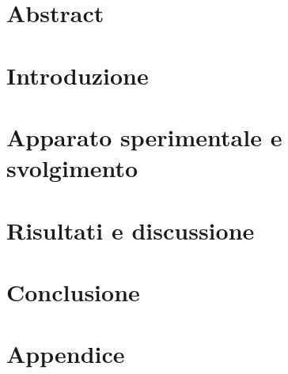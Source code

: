 \documentclass[12pt]{article}
\begin{document}


\section*{Abstract}


\section{Introduzione}


\section{Apparato sperimentale e svolgimento}


\section{Risultati e discussione}


\section*{Conclusione}


\newpage
\section*{\Huge Appendice}
\appendix


\end{document}
